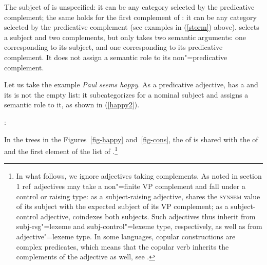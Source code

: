 	
The subject of  is unspecified: it can be any category selected by the predicative
complement; the same holds for the first complement of :
it can be any category
selected by the predicative complement (see examples in (\ref{storm}) above).   selects
a subject and two complements, but only takes two semantic arguments: one corresponding to its
subject, and one corresponding to its predicative complement. It does not assign a semantic role to
its non"=predicative complement.

Let us take the example \textit{Paul seems happy}. As a predicative adjective,  has a
\headf [\prd $+$] and its \subjf is not the empty list: it subcategorizes for a nominal subject and
assigns a semantic role to it, as shown in (\ref{happy2}).
	
\eas
\label{happy2}
:\\
\zs

In the trees in the Figures~\ref{fig-happy} and~\ref{fig-cons}, the \subjf of  is
shared with the \subjf of  and the first element of the \comps list of
.\footnote{In what follows, we ignore adjectives taking complements. As noted in section 1 ref\, adjectives may take a non"=finite VP complement and fall under a control or raising type: as a subject-raising adjective,  shares the \textsc{synsem} value of its subject with the expected subject of its VP complement; as a subject-control adjective,  coindexes both subjects.
Such adjectives thus inherit from subj-rsg"=lexeme and subj-control"=lexeme type, respectively, as well as from adjective"=lexeme type. In some languages, copular constructions are complex predicates, which means that the copular verb inherits the complements of the adjective as well, see .}



